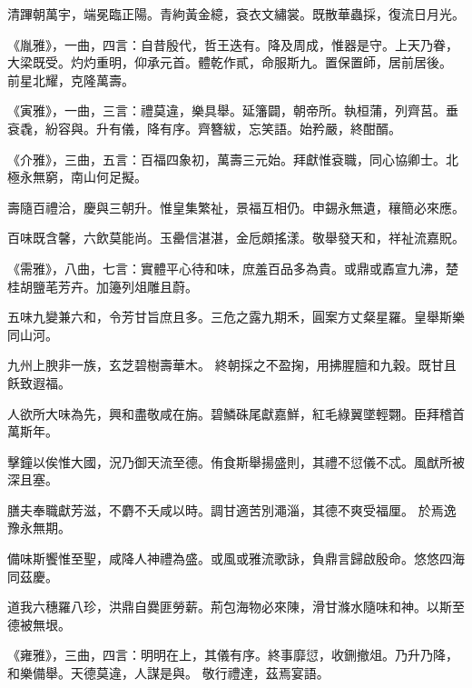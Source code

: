 \begin{pinyinscope}
 清蹕朝萬宇，端冕臨正陽。青絇黃金繶，袞衣文繡裳。既散華蟲採，復流日月光。



 《胤雅》，一曲，四言：自昔殷代，哲王迭有。降及周成，惟器是守。上天乃眷，大梁既受。灼灼重明，仰承元首。體乾作貳，命服斯九。置保置師，居前居後。
 前星北耀，克隆萬壽。



 《寅雅》，一曲，三言：禮莫違，樂具舉。延籓闢，朝帝所。執桓蒲，列齊莒。垂袞毳，紛容與。升有儀，降有序。齊簪紱，忘笑語。始矜嚴，終酣醑。



 《介雅》，三曲，五言：百福四象初，萬壽三元始。拜獻惟袞職，同心協卿士。北極永無窮，南山何足擬。



 壽隨百禮洽，慶與三朝升。惟皇集繁祉，景福互相仍。申錫永無遺，穰簡必來應。



 百味既含馨，六飲莫能尚。玉罍信湛湛，金卮頗搖漾。敬舉發天和，祥祉流嘉貺。



 《需雅》，八曲，七言：實體平心待和味，庶羞百品多為貴。或鼎或鼒宣九沸，楚桂胡鹽芼芳卉。加籩列俎雕且蔚。



 五味九變兼六和，令芳甘旨庶且多。三危之露九期禾，圓案方丈粲星羅。皇舉斯樂同山河。



 九州上腴非一族，玄芝碧樹壽華木。
 終朝採之不盈掬，用拂腥膻和九穀。既甘且飫致遐福。



 人欲所大味為先，興和盡敬咸在旃。碧鱗硃尾獻嘉鮮，紅毛綠翼墜輕翾。臣拜稽首萬斯年。



 擊鐘以俟惟大國，況乃御天流至德。侑食斯舉揚盛則，其禮不愆儀不忒。風猷所被深且塞。



 膳夫奉職獻芳滋，不麝不夭咸以時。調甘適苦別澠淄，其德不爽受福厘。
 於焉逸豫永無期。



 備味斯饗惟至聖，咸降人神禮為盛。或風或雅流歌詠，負鼎言歸啟殷命。悠悠四海同茲慶。



 道我六穗羅八珍，洪鼎自爨匪勞薪。荊包海物必來陳，滑甘滌水隨味和神。以斯至德被無垠。



 《雍雅》，三曲，四言：明明在上，其儀有序。終事靡愆，收鉶撤俎。乃升乃降，和樂備舉。天德莫違，人謀是與。
 敬行禮達，茲焉宴語。




\end{pinyinscope}
